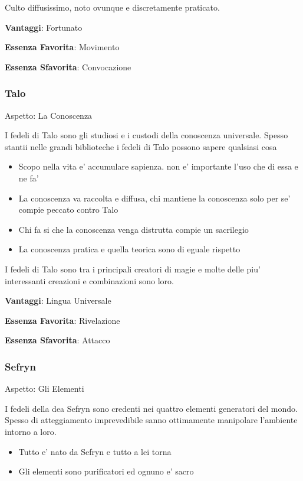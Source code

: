 \documentclass[a4paper,11pt,twoside,openany]{book}
\begin{document}
Culto diffusissimo, noto ovunque e discretamente praticato.


\textbf{Vantaggi}: Fortunato

\textbf{Essenza Favorita}: Movimento

\textbf{Essenza Sfavorita}: Convocazione

\bigskip

\subsubsection{Talo}

Aspetto: La Conoscenza
\bigskip

I fedeli di Talo sono gli studiosi e i custodi della conoscenza universale. Spesso stantii nelle grandi biblioteche i fedeli di Talo possono sapere qualsiasi cosa


\begin{itemize}
	\item Scopo nella vita e' accumulare sapienza. non e' importante l'uso che di essa e ne fa'
	\item La conoscenza va raccolta e diffusa, chi mantiene la conoscenza solo per se' compie peccato contro Talo
	\item Chi fa si che la conoscenza venga distrutta compie un sacrilegio
	\item La conoscenza pratica e quella teorica sono di eguale rispetto
\end{itemize}

I fedeli di Talo sono tra i principali creatori di magie e molte delle piu' interessanti creazioni e combinazioni sono loro.


\textbf{Vantaggi}: Lingua Universale

\textbf{Essenza Favorita}: Rivelazione

\textbf{Essenza Sfavorita}: Attacco
\bigskip


\subsubsection{Sefryn}

Aspetto: Gli Elementi
\bigskip


I fedeli della dea Sefryn sono credenti nei quattro elementi generatori del mondo. Spesso di atteggiamento imprevedibile sanno ottimamente manipolare l'ambiente intorno a loro.


\begin{itemize}
	\item Tutto e' nato da Sefryn e tutto a lei torna
	\item Gli elementi sono purificatori ed ognuno e' sacro
\end{itemize}
\end{document}
